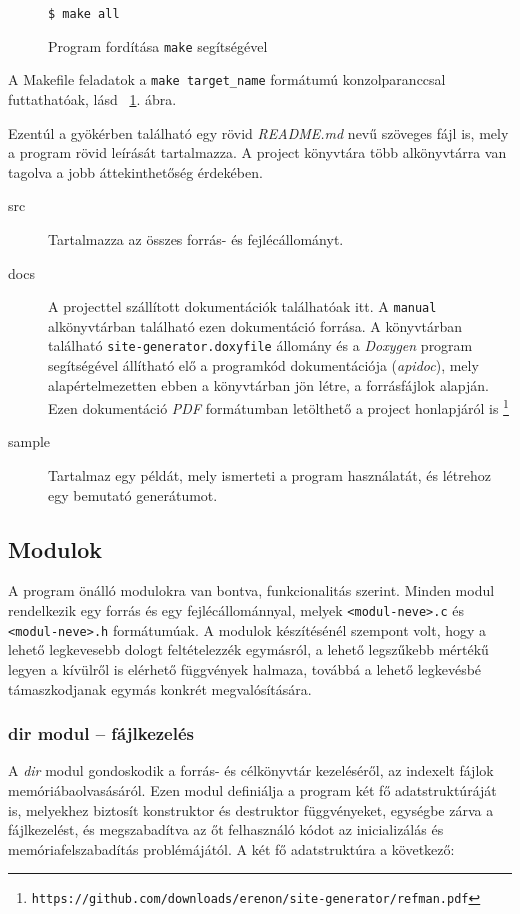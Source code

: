 \documentclass[a4paper,10pt]{article}
\begin{document}
\begin{figure}[h!]
		\begin{lstlisting}
$ make all
		\end{lstlisting}
		\caption{Program fordítása \texttt{make} segítségével}
		\label{fig:makeexample}
\end{figure}

A Makefile feladatok a \texttt{make target\_name} formátumú konzolparanccsal futtathatóak, lásd ~\ref{fig:makeexample}. ábra.

Ezentúl a gyökérben található egy rövid \emph{README.md} nevű szöveges fájl is, mely a program rövid leírását tartalmazza. A project könyvtára több alkönyvtárra van tagolva a jobb áttekinthetőség érdekében.

\begin{description}
	\item[src] Tartalmazza az összes forrás- és fejlécállományt.
	\item[docs] A projecttel szállított dokumentációk találhatóak itt. A \texttt{manual} alkönyvtárban található ezen dokumentáció forrása. A könyvtárban található \texttt{site-generator.doxyfile} állomány és a \emph{Doxygen} program segítségével állítható elő a programkód dokumentációja (\emph{apidoc}), mely alapértelmezetten ebben a könyvtárban jön létre, a forrásfájlok alapján. Ezen dokumentáció \emph{PDF} formátumban letölthető a project honlapjáról is \footnote{\texttt{https://github.com/downloads/erenon/site-generator/refman.pdf}}
	\item[sample] Tartalmaz egy példát, mely ismerteti a program használatát, és létrehoz egy bemutató generátumot.
\end{description}

\subsection{Modulok}
A program önálló modulokra van bontva, funkcionalitás szerint. Minden modul rendelkezik egy forrás és egy fejlécállománnyal, melyek \texttt{<modul-neve>.c} és \texttt{<modul-neve>.h} formátumúak. A modulok készítésénél szempont volt, hogy a lehető legkevesebb dologt feltételezzék egymásról, a lehető legszűkebb mértékű legyen a kívülről is elérhető függvények halmaza, továbbá a lehető legkevésbé támaszkodjanak egymás konkrét megvalósítására.
\subsubsection{dir modul -- fájlkezelés}
A \emph{dir} modul gondoskodik a forrás- és célkönyvtár kezeléséről, az indexelt fájlok memóriábaolvasásáról. Ezen modul definiálja a program két fő adatstruktúráját is, melyekhez biztosít konstruktor és destruktor függvényeket, egységbe zárva a fájlkezelést, és megszabadítva az őt felhasználó kódot az inicializálás és memóriafelszabadítás problémájától.
A két fő adatstruktúra a következő:
\end{document}
